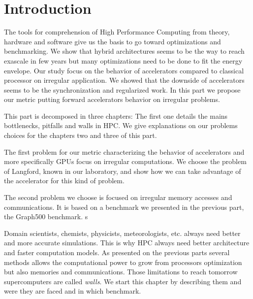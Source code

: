 
\chapter*{Introduction}

The tools for comprehension of High Performance Computing from theory, hardware and software give us the basis to go toward optimizations and benchmarking. 
We show that hybrid architectures seems to be the way to reach exascale in few years but many optimizations need to be done to fit the energy envelope. 
Our study focus on the behavior of accelerators compared to classical processor on irregular application. 
We showed that the downside of accelerators seems to be the synchronization and regularized work. 
In this part we propose our metric putting forward accelerators behavior on irregular problems. 

This part is decomposed in three chapters:
The first one details the mains bottlenecks, pitfalls and walls in HPC.
We give explanations on our problems choices for the chapters two and three of this part. 

The first problem for our metric characterizing the behavior of accelerators and more specifically GPUs focus on irregular computations. 
We choose the problem of Langford, known in our laboratory, and show how we can take advantage of the accelerator for this kind of problem. 

The second problem we choose is focused on irregular memory accesses and communications. 
It is based on a benchmark we presented in the previous part, the Graph500 benchmark.
s

Domain scientists, chemists, physicists, meteorologists, etc. always need better and more accurate simulations. 
This is why HPC always need better architecture and faster computation models. 
As presented on the previous parts several methods allows the computational power to grow from processors optimization but also memories and communications. 
Those limitations to reach tomorrow supercomputers are called \textit{walls}.
We start this chapter by describing them and were they are faced and in which benchmark.

